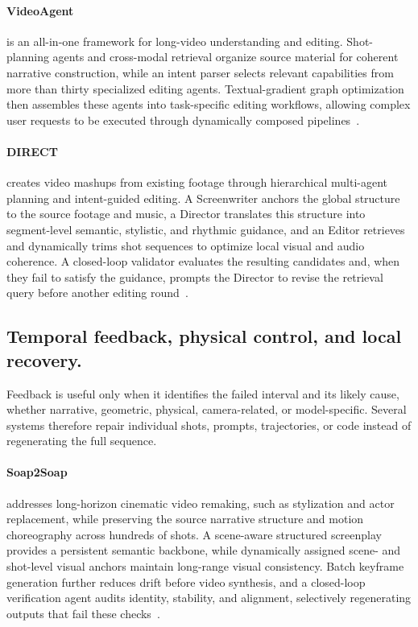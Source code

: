 \paragraph{VideoAgent}
 is an all-in-one framework for long-video understanding and editing. Shot-planning agents and cross-modal retrieval organize source material for coherent narrative construction, while an intent parser selects relevant capabilities from more than thirty specialized editing agents. Textual-gradient graph optimization then assembles these agents into task-specific editing workflows, allowing complex user requests to be executed through dynamically composed pipelines~\cite{avg260623327}.

\paragraph{DIRECT}
 creates video mashups from existing footage through hierarchical multi-agent planning and intent-guided editing. A Screenwriter anchors the global structure to the source footage and music, a Director translates this structure into segment-level semantic, stylistic, and rhythmic guidance, and an Editor retrieves and dynamically trims shot sequences to optimize local visual and audio coherence. A closed-loop validator evaluates the resulting candidates and, when they fail to satisfy the guidance, prompts the Director to revise the retrieval query before another editing round~\cite{avg260404875}.

\subsection{Temporal feedback, physical control, and local recovery.}
Feedback is useful only when it identifies the failed interval and its likely cause, whether narrative, geometric, physical, camera-related, or model-specific. Several systems therefore repair individual shots, prompts, trajectories, or code instead of regenerating the full sequence.

\paragraph{Soap2Soap}
 addresses long-horizon cinematic video remaking, such as stylization and actor replacement, while preserving the source narrative structure and motion choreography across hundreds of shots. A scene-aware structured screenplay provides a persistent semantic backbone, while dynamically assigned scene- and shot-level visual anchors maintain long-range visual consistency. Batch keyframe generation further reduces drift before video synthesis, and a closed-loop verification agent audits identity, stability, and alignment, selectively regenerating outputs that fail these checks~\cite{avg260517423}.

